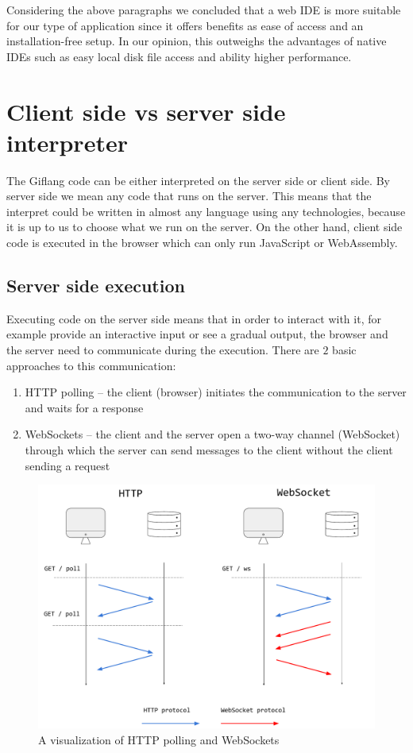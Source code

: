 Considering the above paragraphs we concluded that a web IDE is more suitable for our type of application since it offers benefits as
ease of access and an installation-free setup. In our opinion, this outweighs the advantages of native IDEs such as easy local disk
file access and ability higher performance.

\section{Client side vs server side interpreter}

The Giflang code can be either interpreted on the server side or client side. By server side we mean any code that runs on the server. This means that
the interpret could be written in almost any language using any technologies, because it is up to us to choose what we run on the server. On the other hand,
client side code is executed in the browser which can only run JavaScript or WebAssembly.

\subsection{Server side execution}
Executing code on the server side means that in order to interact with it, for example provide an interactive input or see a gradual output, the browser and
the server need to communicate during the execution. There are $2$ basic approaches to this communication:
\begin{enumerate}
\item HTTP polling -- the client (browser) initiates the communication to the server and waits for a response
\item WebSockets -- the client and the server open a two-way channel (WebSocket) through which the server can send messages to the client without
the client sending a request 
\end{enumerate}

\begin{figure}[!hbt]
	\includegraphics[width=\textwidth]{../img/websockets}
	\caption{A visualization of HTTP polling and WebSockets}
	\label{fig:chap2:websockets}
\end{figure}


